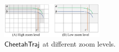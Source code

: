 
\begin{figure}[t]
	\centering
	\includegraphics[width=0.45\textwidth]{pictures/problemsolveing/one_to_many.pdf}
	\vspace{-2mm}
	\caption{$\mathsf{CheetahTraj}$ at different zoom levels.}	\label{fig:zoom} %
    \vspace{-2mm}
\end{figure}









%


